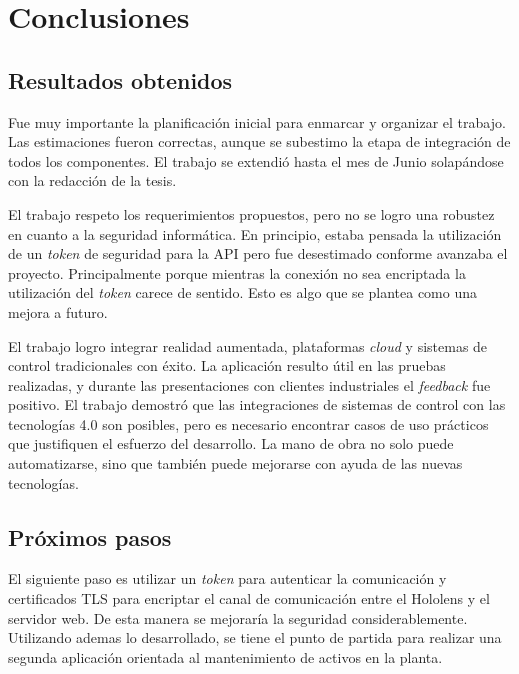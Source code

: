 
\chapter{Conclusiones} %

\label{Chapter5} %




\section{Resultados obtenidos}

Fue muy importante la planificación inicial para enmarcar y organizar el trabajo. Las estimaciones fueron correctas, aunque se subestimo la etapa de integración de todos los componentes. El trabajo se extendió hasta el mes de Junio solapándose con la redacción de la tesis. 

El trabajo respeto los requerimientos propuestos, pero no se logro una robustez en cuanto a la seguridad informática. En principio, estaba pensada la utilización de un \textit{token} de seguridad para la API pero fue desestimado conforme avanzaba el proyecto. Principalmente porque mientras la conexión no sea encriptada la utilización del \textit{token} carece de sentido. Esto es algo que se plantea como una mejora a futuro.

El trabajo logro integrar realidad aumentada, plataformas \textit{cloud} y sistemas de control tradicionales con éxito. La aplicación resulto útil en las pruebas realizadas, y durante las presentaciones con clientes industriales el \textit{feedback} fue positivo. El trabajo demostró que las integraciones de sistemas de control con las tecnologías 4.0 son posibles, pero es necesario encontrar casos de uso prácticos que justifiquen el esfuerzo del desarrollo. La mano de obra no solo puede automatizarse, sino que también puede mejorarse con ayuda de las nuevas tecnologías.

\section{Próximos pasos}

El siguiente paso es utilizar un \textit{token} para autenticar la comunicación y certificados TLS  para encriptar el canal de comunicación entre el Hololens y el servidor web. De esta manera se mejoraría la seguridad considerablemente. Utilizando ademas lo desarrollado, se tiene el punto de partida para realizar una segunda aplicación orientada al mantenimiento de activos en la planta.
